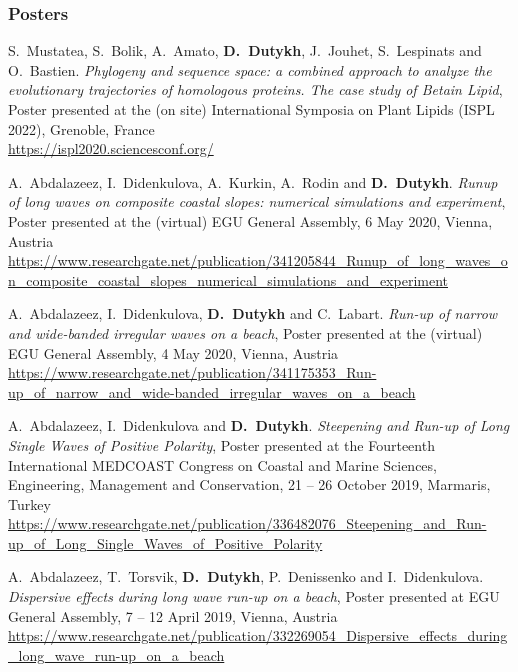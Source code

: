 \separator
\subsubsection{Posters}

\begin{etaremune}

  \item S.~Mustatea, S.~Bolik, A.~Amato, \textbf{D.~Dutykh}, J.~Jouhet, S.~Lespinats and O.~Bastien. \textit{Phylogeny and sequence space: a combined approach to analyze the evolutionary trajectories of homologous proteins. The case study of Betain Lipid}, Poster presented at the (on site) International Symposia on Plant Lipids (ISPL 2022), Grenoble, France \\
  \url{https://ispl2020.sciencesconf.org/}

  \item A.~Abdalazeez, I.~Didenkulova, A.~Kurkin, A.~Rodin and \textbf{D.~Dutykh}. \textit{Runup of long waves on composite coastal slopes: numerical simulations and experiment}, Poster presented at the (virtual) EGU General Assembly, 6 May 2020, Vienna, Austria \\
  \url{https://www.researchgate.net/publication/341205844_Runup_of_long_waves_on_composite_coastal_slopes_numerical_simulations_and_experiment}

  \item A.~Abdalazeez, I.~Didenkulova, \textbf{D.~Dutykh} and C.~Labart. \textit{Run-up of narrow and wide-banded irregular waves on a beach}, Poster presented at the (virtual) EGU General Assembly, 4 May 2020, Vienna, Austria \\
  \url{https://www.researchgate.net/publication/341175353_Run-up_of_narrow_and_wide-banded_irregular_waves_on_a_beach}

  \item A.~Abdalazeez, I.~Didenkulova and \textbf{D.~Dutykh}. \textit{Steepening and Run-up of Long Single Waves of Positive Polarity}, Poster presented at the Fourteenth International MEDCOAST Congress on Coastal and Marine Sciences, Engineering, Management and Conservation, 21 -- 26 October 2019, Marmaris, Turkey \\
  \url{https://www.researchgate.net/publication/336482076_Steepening_and_Run-up_of_Long_Single_Waves_of_Positive_Polarity}

  \item A.~Abdalazeez, T.~Torsvik, \textbf{D.~Dutykh}, P.~Denissenko and I.~Didenkulova. \textit{Dispersive effects during long wave run-up on a beach}, Poster presented at EGU General Assembly, 7 -- 12 April 2019, Vienna, Austria \\
  \url{https://www.researchgate.net/publication/332269054_Dispersive_effects_during_long_wave_run-up_on_a_beach}
  

\end{etaremune}
